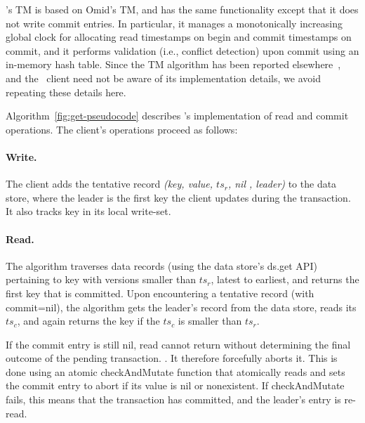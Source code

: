 \sys's TM is based on Omid's TM, and has the same functionality except that it does not write commit entries.
In particular, it manages a monotonically increasing global clock for allocating read timestamps on begin and commit timestamps on commit,
and it performs validation (i.e., conflict detection) upon commit using an in-memory hash table. 
Since the TM algorithm has been reported elsewhere~\cite{Omid2017}, and the \sys\ client need not be aware of 
its implementation details, we avoid repeating these details here. 

Algorithm~\ref{fig:get-pseudocode} describes \sys's implementation of read and commit operations.
The client's operations proceed as follows:

\paragraph{Write.}
The client adds the tentative record \emph{(key, value, $ts_r$, nil , leader)} to the data store, where
the leader is the first key the client updates during the transaction. It also tracks key in its local write-set.

\paragraph{Read.}
The algorithm traverses data  records (using the data store's ds.get API) pertaining
to key with versions smaller than $ts_r$, latest to earliest, and returns the first key that is committed. Upon
encountering a tentative record (with commit=nil), the algorithm gets the leader's record from the data store,
reads its $ts_c$, and again returns the key if the $ts_c$ is smaller than $ts_r$. 

If the commit entry is still nil, read cannot return without determining the final outcome
of the pending transaction. . 
It  therefore forcefully aborts it. This is done using an atomic 
 {checkAndMutate} function that atomically reads and sets the commit entry to abort if its value is nil or nonexistent.
 If checkAndMutate fails, this means that the transaction has committed, and the leader's entry is re-read.


